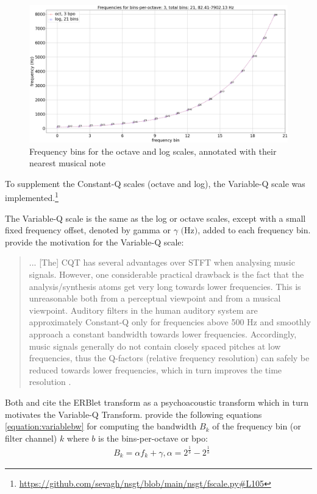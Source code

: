 \documentclass[report.tex]{subfiles}
\begin{document}
\begin{figure}[ht]
	\centering
	\includegraphics[width=\textwidth]{./images-freqscales/log_vs_oct.png}
	\caption{Frequency bins for the octave and log scales, annotated with their nearest musical note}
	\label{fig:octvlog}
\end{figure}

To supplement the Constant-Q scales (octave and log), the Variable-Q scale \parencite{variableq1, variableq2} was implemented.\footnote{\url{https://github.com/sevagh/nsgt/blob/main/nsgt/fscale.py\#L105}}

The Variable-Q scale is the same as the log or octave scales, except with a small fixed frequency offset, denoted by gamma or $\gamma \text{ (Hz)}$, added to each frequency bin. \citeauthor{variableq1} provide the motivation for the Variable-Q scale:
\begin{quote}
	... [The] CQT has several advantages over STFT when analysing music signals. However, one considerable practical drawback is the fact that the analysis/synthesis atoms get very long towards lower frequencies. This is unreasonable both from a perceptual viewpoint and from a musical viewpoint. Auditory filters in the human auditory system are approximately Constant-Q only for frequencies above 500 Hz and smoothly approach a constant bandwidth towards lower frequencies. Accordingly, music signals generally do not contain closely spaced pitches at low frequencies, thus the Q-factors (relative frequency resolution) can safely be reduced towards lower frequencies, which in turn improves the time resolution \parencite[5]{variableq1}.
\end{quote}

Both \textcite{variableq1} and \textcite{variableq2} cite the ERBlet transform \parencite{erblet} as a psychoacoustic transform which in turn motivates the Variable-Q Transform. \textcite{variableq1, variableq2} provide the following equations \eqref{equation:variablebw} for computing the bandwidth $B_{k}$ of the frequency bin (or filter channel) $k$ where $b$ is the bins-per-octave or bpo:
\begin{align}\tag{25}\label{equation:variablebw}
	\nonumber & B_{k} = \alpha f_{k} + \gamma, \alpha = 2^{\frac{1}{b}} - 2^{\frac{1}{b}}
\end{align}
\end{document}
